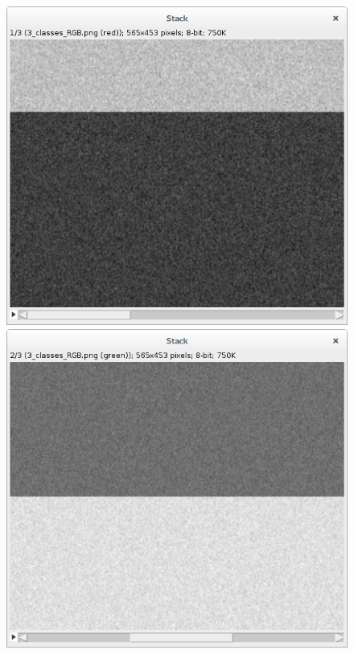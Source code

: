 \documentclass[a4paper,12pt]{report}
\begin{document}
\begin{figure}[!ht]
	\center	
	\includegraphics[scale=0.25]{image/stack-1.png}
	\includegraphics[scale=0.25]{image/stack-2.png}

\end{figure}
\end{document}
